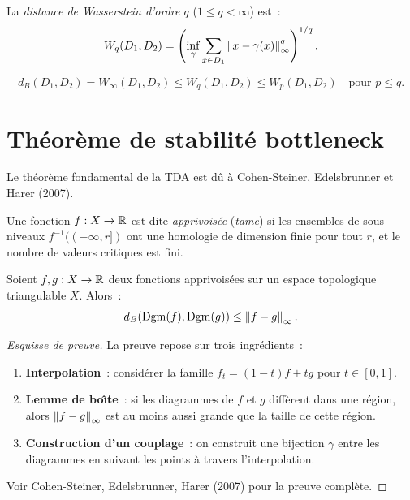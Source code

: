 \begin{definition}
La \emph{distance de Wasserstein d'ordre $q$} ($1 \leq q < \infty$) est~:
\[
  W_q(D_1, D_2) = \left(\inf_{\gamma} \sum_{x \in D_1}
  \left\| x - \gamma(x) \right\|_\infty^q \right)^{1/q}.
\]
\end{definition}

\begin{formules}[title=\textbf{Relation entre distances}]
\[
  d_B(D_1, D_2) = W_\infty(D_1, D_2) \leq W_q(D_1, D_2) \leq
  W_p(D_1, D_2) \quad \text{pour } p \leq q.
\]
\end{formules}

\section{Th\'eor\`eme de stabilit\'e bottleneck}

Le th\'eor\`eme fondamental de la TDA est d\^u \`a Cohen-Steiner,
Edelsbrunner et Harer (2007).

\begin{definition}
Une fonction $f : X \to \mathbb{R}$ est dite \emph{apprivois\'ee} (\emph{tame})
si les ensembles de sous-niveaux $f^{-1}((-\infty, r])$ ont une
homologie de dimension finie pour tout $r$, et le nombre de valeurs
critiques est fini.
\end{definition}

\begin{theoreme}
Soient $f, g : X \to \mathbb{R}$ deux fonctions apprivois\'ees sur un espace
topologique triangulable $X$. Alors~:
\[
  d_B(\mathrm{Dgm}(f), \mathrm{Dgm}(g))
  \leq \left\| f - g \right\|_\infty.
\]
\end{theoreme}

\begin{proof}[Esquisse de preuve]
La preuve repose sur trois ingr\'edients~:
\begin{enumerate}
  \item \textbf{Interpolation}~: consid\'erer la famille
        $f_t = (1-t)f + tg$ pour $t \in [0, 1]$.
  \item \textbf{Lemme de bo\^{\i}te}~: si les diagrammes de $f$ et $g$
        diff\`erent dans une r\'egion, alors $\left\| f - g \right\|_\infty$
        est au moins aussi grande que la taille de cette r\'egion.
  \item \textbf{Construction d'un couplage}~: on construit une bijection
        $\gamma$ entre les diagrammes en suivant les points \`a travers
        l'interpolation.
\end{enumerate}
Voir Cohen-Steiner, Edelsbrunner, Harer (2007) pour la preuve compl\`ete.
\end{proof}

